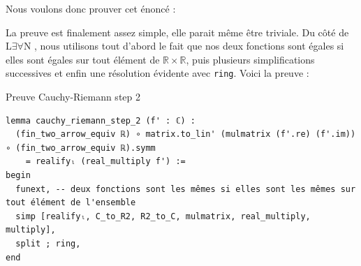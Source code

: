 \documentclass[a4paper, 11pt, twoside]{report}
\newcommand\R{\mathbb{R}}
\newcommand{\LEAN}{L$\exists\forall$N }
\begin{document}
Nous voulons donc prouver cet énoncé :


La preuve est finalement assez simple, elle parait même être triviale. Du côté de \LEAN, nous utilisons tout d'abord le fait que nos deux fonctions sont égales si elles sont égales sur tout élément de $\R\times\R$, puis plusieurs simplifications successives et enfin une résolution évidente avec \verb|ring|. Voici la preuve :

\begin{code}{Preuve Cauchy-Riemann step 2}
\begin{lstlisting}
lemma cauchy_riemann_step_2 (f' : ℂ) : 
  (fin_two_arrow_equiv ℝ) ∘ matrix.to_lin' (mulmatrix (f'.re) (f'.im)) ∘ (fin_two_arrow_equiv ℝ).symm 
    = realifyₗ (real_multiply f') :=
begin
  funext, -- deux fonctions sont les mêmes si elles sont les mêmes sur tout élément de l'ensemble
  simp [realifyₗ, C_to_R2, R2_to_C, mulmatrix, real_multiply, multiply],
  split ; ring,
end
\end{lstlisting}
\end{code}
\end{document}
